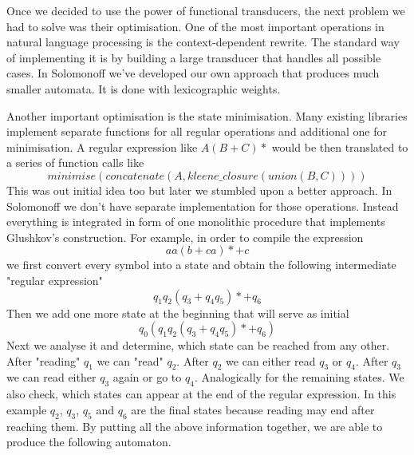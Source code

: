 \documentclass[12pt]{article}
\begin{document}
Once we decided to use the power of functional transducers, the next problem we had to solve was their optimisation. One of the most important operations in natural language processing is the context-dependent rewrite. The standard way of implementing it is by building a large transducer that handles all possible cases.
In Solomonoff we've developed our own approach that produces much smaller automata. It is done with lexicographic weights.

Another important optimisation is the state minimisation. Many existing libraries implement separate functions for all regular operations and additional one for minimisation. A regular expression like $A(B+C)*$ would be then translated to a series of function calls like 
\[
minimise(concatenate(A,kleene\_closure(union(B,C)))) 
\]
This was out initial idea too but later we stumbled upon a better approach. In Solomonoff we don't have separate implementation for those operations. Instead everything is integrated in form of one monolithic procedure that implements Glushkov's construction. For example, in order to compile the expression
\[
aa(b+ca)*+c
\] we first convert every symbol into a state and obtain the following intermediate "regular expression"  
\[
q_1q_2(q_3+q_4 q_5)*+q_6
\]
Then we add one more state at the beginning that will serve as initial
\[
q_0(q_1q_2(q_3+q_4 q_5)*+q_6)
\]
Next we analyse it and determine, which state can be reached from any other. After "reading" $q_1$ we can "read" $q_2$. After $q_2$ we can either read $q_3$ or $q_4$. After $q_3$ we can read either $q_3$ again or go to $q_4$. Analogically for the remaining states. We also check, which states can appear at the end of the regular expression. In this example $q_2$, $q_3$, $q_5$ and $q_6$ are the final states because reading may end after reaching them. By putting all the above information together, we are able to produce the following automaton.
\end{document}
